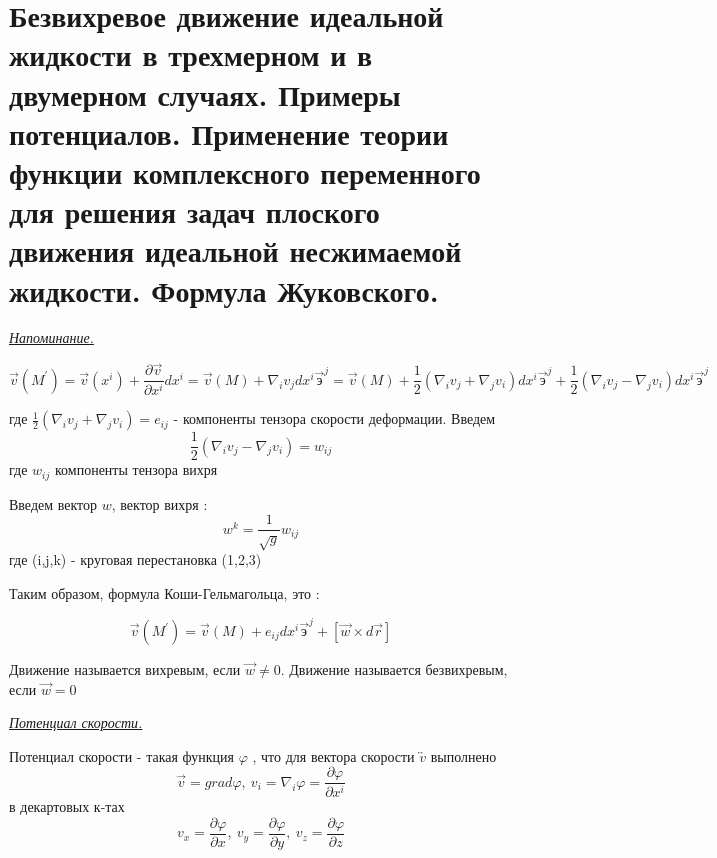 \newpage
\section{Безвихревое движение идеальной жидкости в трехмерном и в двумерном случаях. Примеры потенциалов. Применение теории функции комплексного переменного для решения задач плоского движения идеальной несжимаемой жидкости. Формула Жуковского.}

\begin{center}
  \textit{\underline{Напоминание.}}
\end{center}



$$
  \overrightarrow{v}(M^{'}) = \overrightarrow{v}(x^{i}) + \frac{\partial \overrightarrow{v}}{\partial x^{i}} dx^{i} = \overrightarrow{v}(M) + \nabla_{i} v_{j}dx^{i} \overrightarrow{\text{э}}^{j} = \overrightarrow{v}(M) + \frac{1}{2} (\nabla_i v_j + \nabla_j v_i) dx^{i} \overrightarrow{\text{э}}^{j} + \frac{1}{2} (\nabla_i v_j - \nabla_j v_i) dx^{i} \overrightarrow{\text{э}}^{j}
$$

где $\frac{1}{2} (\nabla_i v_j + \nabla_j v_i) = e_{ij}$ - компоненты тензора скорости деформации. Введем
$$
  \frac{1}{2} (\nabla_i v_j - \nabla_j v_i) = w_{ij}
$$
где $w_{ij}$ компоненты тензора вихря

Введем вектор $w$, вектор вихря :
$$
  w^{k} = \frac{1}{\sqrt{g}}w_{ij}
$$
где (i,j,k) - круговая перестановка (1,2,3)

Таким образом, формула Коши-Гельмагольца, это :

$$
  \overrightarrow{v}(M^{'}) = \overrightarrow{v}(M) + e_{ij} dx^{i} \overrightarrow{\text{э}}^{j} + [\overrightarrow{w} \times d\overrightarrow{r}]
$$

Движение называется вихревым, если $\overrightarrow{w} \neq 0$. Движение называется безвихревым, если $\overrightarrow{w} = 0$

\begin{center}
  \textit{\underline{Потенциал скорости.}}
\end{center}

Потенциал скорости - такая функция $\varphi$ , что для вектора скорости $\overleftrightarrow{v}$ выполнено
$$
  \overrightarrow{v} = grad \varphi, \ v_i = \nabla_i \varphi = \frac{\partial \varphi}{\partial x^i}
$$
в декартовых к-тах
$$
  v_x = \frac{\partial \varphi}{\partial x}, \ v_y = \frac{\partial \varphi}{\partial y}, \ v_z = \frac{\partial \varphi}{\partial z}
$$

